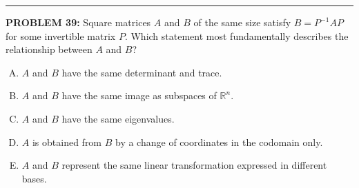\documentclass[12pt]{amsart}
\newcommand{\divider}{
  \vspace{-1em} %
  \noindent
  \raisebox{-0.15ex}{\textbullet}%
  \hspace{0.5em}%
  \rule[0.5ex]{0.95\textwidth}{1.0pt}%
  \hspace{0.5em}%
  \raisebox{-0.15ex}{\textbullet}%
  \vspace{0em} %
}
\begin{document}
\divider

{\bf PROBLEM 39:}
Square matrices $A$ and $B$ of the same size satisfy $B = P^{-1} A P$ for some invertible matrix $P$. Which statement most fundamentally describes the relationship between $A$ and $B$?

\begin{enumerate}[(A)]
\item $A$ and $B$ have the same determinant and trace.
\item $A$ and $B$ have the same image as subspaces of $\mathbb{R}^n$.
\item $A$ and $B$ have the same eigenvalues.
\item $A$ is obtained from $B$ by a change of coordinates in the codomain only.
\item $A$ and $B$ represent the same linear transformation expressed in different bases.
\end{enumerate}
\end{document}
